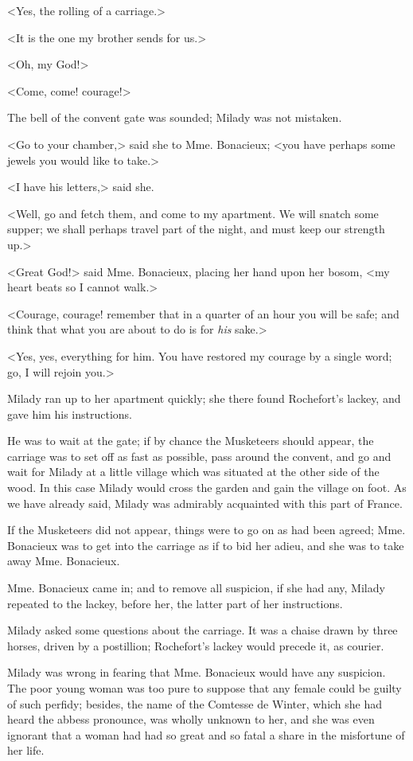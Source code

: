 <Yes, the rolling of a carriage.> 

<It is the one my brother sends for us.> 

<Oh, my God!> 

<Come, come! courage!> 

The bell of the convent gate was sounded; Milady was not mistaken. 

<Go to your chamber,> said she to Mme. Bonacieux; <you have perhaps some jewels you would like to take.> 

<I have his letters,> said she. 

<Well, go and fetch them, and come to my apartment. We will snatch some supper; we shall perhaps travel part of the night, and must keep our strength up.> 

<Great God!> said Mme. Bonacieux, placing her hand upon her bosom, <my heart beats so I cannot walk.> 

<Courage, courage! remember that in a quarter of an hour you will be safe; and think that what you are about to do is for \textit{his} sake.> 

<Yes, yes, everything for him. You have restored my courage by a single word; go, I will rejoin you.> 

Milady ran up to her apartment quickly; she there found Rochefort's lackey, and gave him his instructions. 

He was to wait at the gate; if by chance the Musketeers should appear, the carriage was to set off as fast as possible, pass around the convent, and go and wait for Milady at a little village which was situated at the other side of the wood. In this case Milady would cross the garden and gain the village on foot. As we have already said, Milady was admirably acquainted with this part of France. 

If the Musketeers did not appear, things were to go on as had been agreed; Mme. Bonacieux was to get into the carriage as if to bid her adieu, and she was to take away Mme. Bonacieux. 

Mme. Bonacieux came in; and to remove all suspicion, if she had any, Milady repeated to the lackey, before her, the latter part of her instructions. 

Milady asked some questions about the carriage. It was a chaise drawn by three horses, driven by a postillion; Rochefort's lackey would precede it, as courier. 

Milady was wrong in fearing that Mme. Bonacieux would have any suspicion. The poor young woman was too pure to suppose that any female could be guilty of such perfidy; besides, the name of the Comtesse de Winter, which she had heard the abbess pronounce, was wholly unknown to her, and she was even ignorant that a woman had had so great and so fatal a share in the misfortune of her life. 

